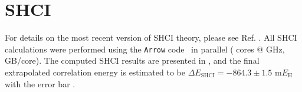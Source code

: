 \documentclass[journal=jcp,manuscript=suppinfo]{achemso}
\begin{document}
\section{SHCI}

For details on the most recent version of SHCI theory, please see Ref. . All SHCI calculations were performed using the {\texttt{Arrow}} code~\cite{arrow} in parallel {\color{red}{on what hardware???}} ({\color{red}{XX}} cores $@$ {\color{red}{XX}} GHz, {\color{red}{XX}} GB/core). The computed SHCI results are presented in {}, and the final extrapolated correlation energy is estimated to be $\Delta E_{\text{SHCI}} = -864.3\pm1.5$ m$E_{\text{H}}$ with the error bar {\color{red}{derived how???}}.
\end{document}
